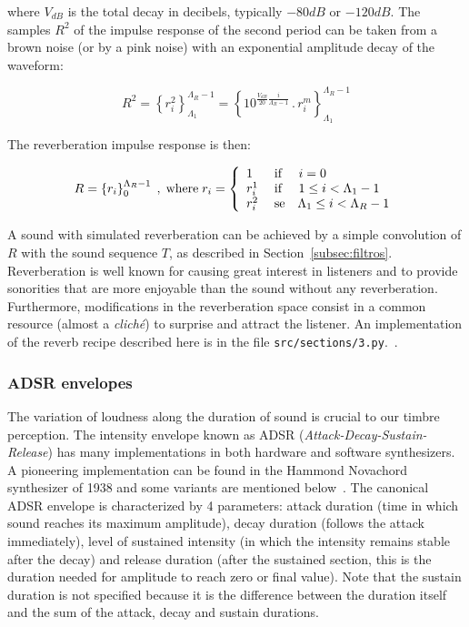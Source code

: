 \noindent where $V_{dB}$ is the total decay in decibels, typically $-80dB$ or $-120dB$.
The samples $R^2$ of the impulse response of the second period can be taken from a brown noise (or by a pink noise) with an exponential amplitude decay of the waveform:

\begin{equation}\label{eq:p2rev}
    R^2=\left\{r_i^2\right\}_{\Lambda_1}^{\Lambda_R-1}=\left\{10^{\frac{V_{dB}}{20}\frac{i}{\Lambda_R-1}}\,.\,r_i^m\right\}_{\Lambda_1}^{\Lambda_R-1}
\end{equation}

The reverberation impulse response is then:

\begin{equation}\label{eq:rev}
	R=\left\{r_i\right\}_0^{\Lambda_R-1}\;,\; \text{where} \; r_i=\left\{
        \begin{array}{l l}
            1\; & \text{if }\quad i=0 \\
            r_i^1\;  & \text{if }\quad 1\leq i<\Lambda_1-1 \\
                                     r_i^2 \; & \text{se}\quad \Lambda_1 \leq i < \Lambda_R-1 \\
        \end{array} \right.
\end{equation}

A sound with simulated reverberation can be achieved by a simple convolution of $R$ with the sound sequence $T$, as described in Section~\ref{subsec:filtros}.
Reverberation is well known for causing great interest in listeners and to provide sonorities that are more enjoyable than the sound without any reverberation.
Furthermore, modifications in the reverberation space consist in a common resource (almost a \textit{clich\'{e}}) to surprise and attract the listener. An implementation of the reverb recipe described here is in the file \texttt{src/sections/3.py}.~\cite{MASSA}.

\subsubsection{ADSR envelopes}
The variation of loudness along the duration of sound is crucial to our timbre perception. The intensity envelope known as ADSR (\emph{Attack-Decay-Sustain-Release}) has many implementations in both hardware and software synthesizers. A pioneering implementation can be found in the Hammond Novachord synthesizer of 1938 and some variants are mentioned below~\cite{ADSR}. The canonical ADSR envelope is characterized by 4 parameters: attack duration (time in which sound reaches its maximum amplitude), decay duration (follows the attack immediately), level of sustained intensity (in which the intensity remains stable after the decay) and release duration (after the sustained section, this is the duration needed for amplitude to reach zero or final value).
Note that the sustain duration is not specified because it is the difference between the duration itself and the sum of the attack, decay and sustain durations.


